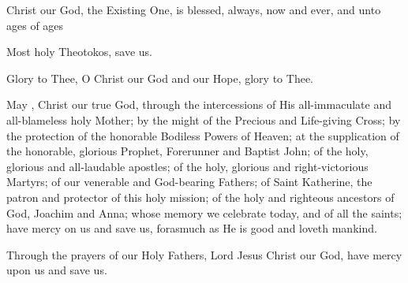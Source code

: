 \documentclass[twoside, letterpaper, 12pt]{report}
\begin{document}
\begin{priest}
\item Christ our God, the Existing One, is blessed, always, now and ever,
    and unto ages of ages
\end{priest}

\begin{priest}
\item Most holy Theotokos, save us.
\end{priest}

\begin{priest}
\item Glory to Thee, O Christ our God and our Hope, glory to Thee.
\end{priest}

\begin{priest}
\item May , Christ our true God, through the intercessions of His
    all-immaculate and all-blameless holy Mother; by the might of the Precious and Life-giving Cross;
    by the protection of the honorable Bodiless Powers of Heaven;
    at the supplication of the honorable, glorious Prophet, Forerunner and Baptist John;
    of the holy, glorious and all-laudable apostles;
    of the holy, glorious and right-victorious Martyrs;
    of our venerable and God-bearing Fathers;
    of Saint Katherine, the patron and protector of this holy mission;
    of the holy and righteous ancestors of God, Joachim and Anna;
     whose memory we celebrate today,
    and of all the saints;
    have mercy on us and save us, forasmuch as He is good and loveth mankind.
\item Through the prayers of our Holy Fathers, Lord Jesus Christ our God,
    have mercy upon us and save us.
\end{priest}
\end{document}
